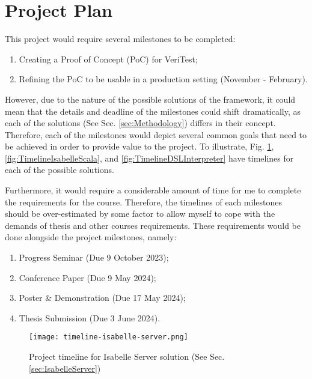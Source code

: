 \section{Project Plan}

This project would require several milestones to be completed:
\begin{enumerate}
    \item Creating a Proof of Concept (PoC) for VeriTest;
    \item Refining the PoC to be usable in a production setting (November - February).
\end{enumerate}

However, due to the nature of the possible solutions of the framework, it could mean that the details and deadline 
of the milestones could shift dramatically, as each of the solutions (See Sec. \ref{sec:Methodology}) differs in 
their concept. Therefore, each of the milestones would depict several common goals that need to be achieved in order to 
provide value to the project. To illustrate, Fig. \ref{fig:TimelineIsabelleServer}, \ref{fig:TimelineIsabelleScala}, 
and \ref{fig:TimelineDSLInterpreter} have timelines for each of the possible solutions.

Furthermore, it would require a considerable amount of time for me to complete the requirements for the course.
Therefore, the timelines of each milestones should be over-estimated by some factor to allow myself to cope with 
the demands of thesis and other courses requirements. These requirements would be done alongside the project milestones, 
namely:

\begin{enumerate}
    \item Progress Seminar (Due 9 October 2023);
    \item Conference Paper (Due 9 May 2024);
    \item Poster \& Demonstration (Due 17 May 2024);
    \item Thesis Submission (Due 3 June 2024).
\end{enumerate}

\begin{figure}
    \label{fig:TimelineIsabelleServer}
    \centering
    \texttt{[image: timeline-isabelle-server.png]}
    \caption{Project timeline for Isabelle Server solution (See Sec. \ref{sec:IsabelleServer})}
\end{figure}

